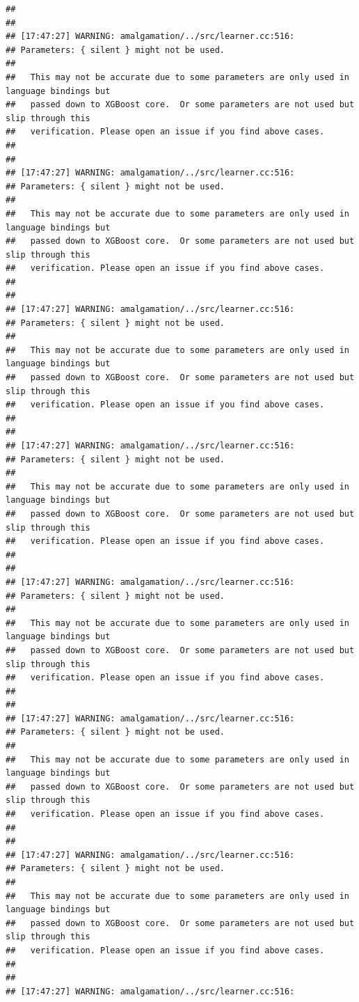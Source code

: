 \documentclass[AMS,STIX2COL]{WileyNJD-v2}\usepackage[]{graphicx}\usepackage[]{color}
\makeatletter
\newenvironment{kframe}{%
 \def\at@end@of@kframe{}%
 \ifinner\ifhmode%
  \def\at@end@of@kframe{\end{minipage}}%
  \begin{minipage}{\columnwidth}%
 \fi\fi%
 \def\FrameCommand##1{\hskip\@totalleftmargin \hskip-\fboxsep
 \colorbox{shadecolor}{##1}\hskip-\fboxsep
     \hskip-\linewidth \hskip-\@totalleftmargin \hskip\columnwidth}%
 \MakeFramed {\advance\hsize-\width
   \@totalleftmargin\z@ \linewidth\hsize
   \@setminipage}}%
 {\par\unskip\endMakeFramed%
 \at@end@of@kframe}
\newenvironment{knitrout}{}{} %
\makeatother
\begin{document}
\begin{knitrout}
\begin{kframe}
\begin{verbatim}
## 
## 
## [17:47:27] WARNING: amalgamation/../src/learner.cc:516: 
## Parameters: { silent } might not be used.
## 
##   This may not be accurate due to some parameters are only used in language bindings but
##   passed down to XGBoost core.  Or some parameters are not used but slip through this
##   verification. Please open an issue if you find above cases.
## 
## 
## [17:47:27] WARNING: amalgamation/../src/learner.cc:516: 
## Parameters: { silent } might not be used.
## 
##   This may not be accurate due to some parameters are only used in language bindings but
##   passed down to XGBoost core.  Or some parameters are not used but slip through this
##   verification. Please open an issue if you find above cases.
## 
## 
## [17:47:27] WARNING: amalgamation/../src/learner.cc:516: 
## Parameters: { silent } might not be used.
## 
##   This may not be accurate due to some parameters are only used in language bindings but
##   passed down to XGBoost core.  Or some parameters are not used but slip through this
##   verification. Please open an issue if you find above cases.
## 
## 
## [17:47:27] WARNING: amalgamation/../src/learner.cc:516: 
## Parameters: { silent } might not be used.
## 
##   This may not be accurate due to some parameters are only used in language bindings but
##   passed down to XGBoost core.  Or some parameters are not used but slip through this
##   verification. Please open an issue if you find above cases.
## 
## 
## [17:47:27] WARNING: amalgamation/../src/learner.cc:516: 
## Parameters: { silent } might not be used.
## 
##   This may not be accurate due to some parameters are only used in language bindings but
##   passed down to XGBoost core.  Or some parameters are not used but slip through this
##   verification. Please open an issue if you find above cases.
## 
## 
## [17:47:27] WARNING: amalgamation/../src/learner.cc:516: 
## Parameters: { silent } might not be used.
## 
##   This may not be accurate due to some parameters are only used in language bindings but
##   passed down to XGBoost core.  Or some parameters are not used but slip through this
##   verification. Please open an issue if you find above cases.
## 
## 
## [17:47:27] WARNING: amalgamation/../src/learner.cc:516: 
## Parameters: { silent } might not be used.
## 
##   This may not be accurate due to some parameters are only used in language bindings but
##   passed down to XGBoost core.  Or some parameters are not used but slip through this
##   verification. Please open an issue if you find above cases.
## 
## 
## [17:47:27] WARNING: amalgamation/../src/learner.cc:516: 

\end{verbatim}
\end{kframe}
\end{knitrout}
\end{document}
